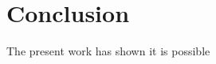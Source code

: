 \documentclass[a4paper,fleqn]{cas-sc}
\begin{document}
\section{Conclusion}

The present work has shown it is possible
\printcredits

%




\bio{}
\endbio

\end{document}
